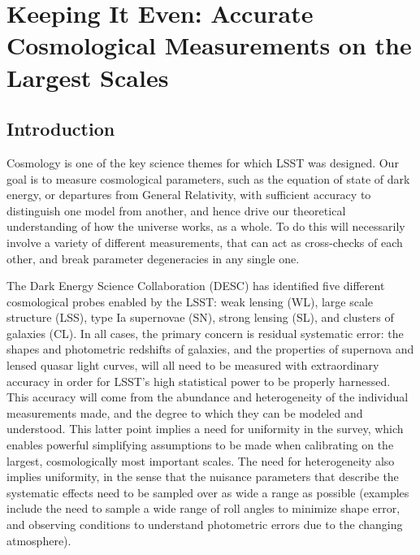 
\chapter[Cosmology]{Keeping It Even: Accurate Cosmological Measurements on the Largest Scales}
\def\chpname{cosmo}\label{chp:\chpname}



\section{Introduction}
\label{sec:\chpname:intro}


Cosmology is one of the key science themes for which LSST was designed. Our goal is to measure cosmological parameters, such as the equation of state of dark energy, or departures from General Relativity, with sufficient accuracy to distinguish one model from another, and hence drive our theoretical understanding of how the universe works, as a whole. To do this will necessarily involve a variety of different measurements, that can act as cross-checks of each other, and break parameter degeneracies in any single one.

The  Dark Energy Science Collaboration (DESC) has identified five
different cosmological probes enabled by the LSST: weak lensing (WL),
large scale structure (LSS), type Ia supernovae (SN), strong lensing
(SL), and clusters of galaxies (CL). In all cases, the primary concern
is residual systematic error: the shapes and photometric redshifts of
galaxies, and the properties of supernova and lensed quasar light
curves, will all need to be measured with extraordinary accuracy in order for LSST's high statistical power to be properly harnessed. This accuracy will come from the abundance and heterogeneity of the individual measurements made, and the degree to which they can be modeled and understood. This latter point implies a need for uniformity in the survey, which enables powerful simplifying assumptions to be made when calibrating on the largest, cosmologically most important scales. The need for heterogeneity also implies  uniformity, in the sense that the nuisance parameters that describe the systematic effects need to be sampled over as wide a range as possible (examples include the need to sample a wide range of roll angles to minimize shape error, and observing conditions to understand photometric errors due to the changing atmosphere).

